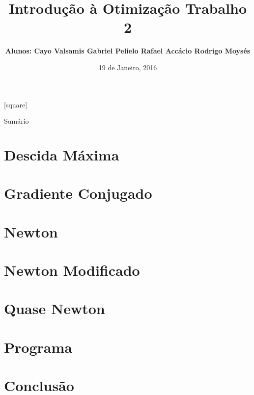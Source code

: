 \documentclass{beamer}
\author{\textbf{Alunos: \newline
		Cayo Valsamis \newline
		Gabriel Pelielo \newline
		Rafael Accácio \newline
		Rodrigo Moysés}}
\title{\textbf{Introdução à Otimização \vspace{0.25cm} \newline 
		       Trabalho 2}}
\institute{Universidade Federal do Rio de Janeiro}
\date{19 de Janeiro, 2016}
\begin{document}
	
	[square]
	
	
	
	\begin{frame}[t,plain]
		\titlepage
	\end{frame}
	
	\begin{frame}{Sumário}
		\tableofcontents
	\end{frame}
	
	
	
	\section{Descida Máxima}
	
	
	
	\section{Gradiente Conjugado}
	
	
	\section{Newton}
		
	
	\section{Newton Modificado}
	
	
	\section{Quase Newton}
	
	
	\section{Programa}
	
	
	\section{Conclusão}
	
	
\end{document}

